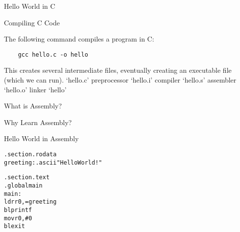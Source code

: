 

\begin{frame}{Hello World in C}
\end{frame}


\begin{frame}[fragile]{Compiling C Code}

	The following command compiles a program in C:

	\begin{verbatim}
    gcc hello.c -o hello
\end{verbatim}

	This creates several intermediate files, eventually creating an executable file (which we can run).
	`hello.c'
	preprocessor
	`hello.i'
	compiler
	`hello.s'
	assembler
	`hello.o'
	linker
	`hello'

\end{frame}

\begin{frame}{What is Assembly?}
\end{frame}


\begin{frame}{Why Learn Assembly?}
\end{frame}


\begin{frame}[fragile]{Hello World in Assembly}
	\begin{alltt}
		.section .rodata
		greeting: .ascii "Hello World!\n\0"

		.section .text
		.global main
		main:
		ldr r0, =greeting
		bl printf
		mov r0, \#0
		bl exit
	\end{alltt}
\end{frame}

